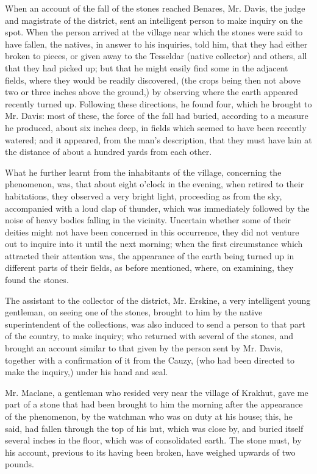 \documentclass[a4paper, 12pt, oneside, twocolumn]{article}
\begin{document}
When an account of the fall of the stones reached Benares, Mr. Davis, the judge and magistrate of the district, sent an intelligent person to make inquiry on the spot. When the person arrived at the village near which the stones were said to have fallen, the natives, in answer to his inquiries, told him, that they had either broken to pieces, or given away to the Tesseldar (native collector) and others, all that they had picked up; but that he might easily find some in the adjacent fields, where they would be readily discovered, (the crops being then not above two or three inches above the ground,) by observing where the earth appeared recently turned up. Following these directions, he found four, which he brought to Mr. Davis: most of these, the force of the fall had buried, according to a measure he produced, about six inches deep, in fields which seemed to have been recently watered; and it appeared, from the man's description, that they must have lain at the distance of about a hundred yards from each other.

What he further learnt from the inhabitants of the village, concerning the phenomenon, was, that about eight o'clock in the evening, when retired to their habitations, they observed a very bright light, proceeding as from the sky, accompanied with a loud clap of thunder, which was immediately followed by the noise of heavy bodies falling in the vicinity. Uncertain whether some of their deities might not have been concerned in this occurrence, they did not venture out to inquire into it until the next morning; when the first circumstance which attracted their attention was, the appearance of the earth being turned up in different parts of their fields, as before mentioned, where, on examining, they found the stones.

The assistant to the collector of the district, Mr. Erskine, a very intelligent young gentleman, on seeing one of the stones, brought to him by the native superintendent of the collections, was also induced to send a person to that part of the country, to make inquiry; who returned with several of the stones, and brought an account similar to that given by the person sent by Mr. Davis, together with a confirmation of it from the Cauzy, (who had been directed to make the inquiry,) under his hand and seal.

Mr. Maclane, a gentleman who resided very near the village of Krakhut, gave me part of a stone that had been brought to him the morning after the appearance of the phenomenon, by the watchman who was on duty at his house; this, he said, had fallen through the top of his hut, which was close by, and buried itself several inches in the floor, which was of consolidated earth. The stone must, by his account, previous to its having been broken, have weighed upwards of two pounds.
\end{document}
